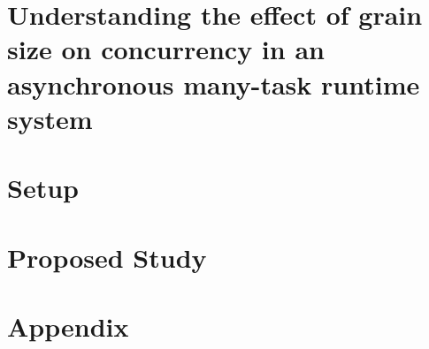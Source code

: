 \documentclass[12pt,letterpaper]{lsuetd}
\begin{document}
\chapter{Understanding the effect of grain size on concurrency in an asynchronous many-task runtime system}\label{Bathtub}
\doublespacing

\pagebreak
\singlespacing

\chapter{Setup}\label{Results}
\doublespacing

\pagebreak
\singlespacing

\chapter{Proposed Study}\label{Future}
\doublespacing

\pagebreak
\singlespacing

\chapter{Appendix}
\doublespacing

\pagebreak
\singlespacing

\vspace{0.9em}


%


\pagebreak
\singlespacing
\appendix
%
%
%
\end{document}
